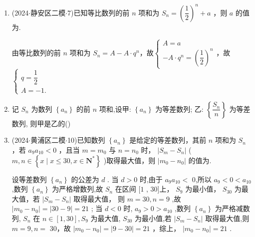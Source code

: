 \begin{enumerate}
    \item (2024$\cdot$静安区二模$\cdot$7)已知等比数列的前 $n$ 项和为 ${S}_{n} = {\left( \dfrac{1}{2}\right) }^{n} + a$ ，则 $a$ 的值为.
    \begin{jieda}
        由等比数列的前 $n$ 项和为 ${S}_{n} = A - A \cdot q^n$，故$\left\{\begin{array}{l}
            A = a \\
            -A \cdot q^n = {\left( \dfrac{1}{2}\right) }^{n}
        \end{array}\right.$，故$\left\{\begin{array}{l}
            q = \dfrac{1}{2} \\
            A = -1.
        \end{array}\right.$
    \end{jieda}
    \item 记 ${S}_{n}$ 为数列 $\left\{  {a}_{n}\right\}$ 的前 $n$ 项和,设甲: $\left\{  {a}_{n}\right\}$ 为等差数列; 乙: $\left\{  \dfrac{{S}_{n}}{n}\right\}$ 为等差数列, 则甲是乙的{()}

    \item (2024$\cdot$黄浦区二模$\cdot$10)已知数列 $\left\{  {a}_{n}\right\}$ 是给定的等差数列，其前 $n$ 项和为 ${S}_{n}$ ，若 ${a}_{9}{a}_{10} < 0$ ，且当 $m =  {m}_{0}$ 与 $n = {n}_{0}$ 时， $\left| {{S}_{m} - {S}_{n}}\right|$ ( $m,n \in  \left\{  {x \mid  x \leq  {30},x \in  {\mathbf{N}}^{ * }}\right\}$ )取得最大值，则 $\left| {{m}_{0} - {n}_{0}}\right|$ 的值为.
    \begin{jieda}
        设等差数列 $\left\{  {a}_{n}\right\}$ 的公差为 $d$ . 当 $d > 0$ 时,由于 ${a}_{9}{a}_{10} <$ 0,所以 ${a}_{9} < 0 < {a}_{10}$ ,数列 $\left\{  {a}_{n}\right\}$ 为严格增数列,故 ${S}_{n}$ 在区间 $\lbrack 1$ , 30]上， ${S}_{9}$ 为最小值， ${S}_{30}$ 为最大值，若 $\left| {{S}_{m} - {S}_{n}}\right|$ 取得最大值， 则 $m = {30},n = 9$ ,故 $\left| {{m}_{0} - {n}_{0}}\right|  = \left| {{30} - 9}\right|  = {21}$ ; 当 $d < 0$ 时, ${a}_{9} > 0 > {a}_{10}$ ,数列 $\left\{  {a}_{n}\right\}$ 为严格减数列, ${S}_{n}$ 在 $n \in  \left\lbrack  {1,{30}}\right\rbrack  ,{S}_{9}$ 为最大值, ${S}_{30}$ 为最小值,若 $\left| {{S}_{m} - {S}_{n}}\right|$ 取得最大值,则 $m = 9,n =$ 30，故 $\left| {{m}_{0} - {n}_{0}}\right|  = \left| {9 - {30}}\right|  = {21}$ ，综上， $\left| {{m}_{0} - {n}_{0}}\right|  = {21}$ .
    \end{jieda}


\end{enumerate}
